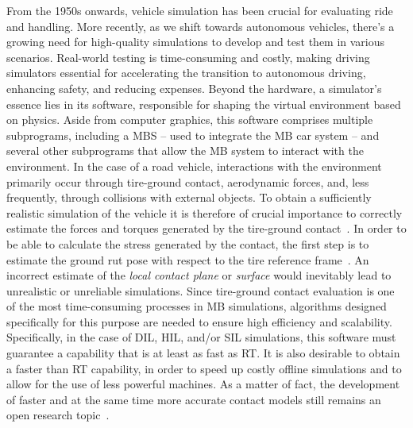 From the 1950s onwards, vehicle simulation has been crucial for evaluating ride and handling. More recently, as we shift towards autonomous vehicles, there's a growing need for high-quality simulations to develop and test them in various scenarios. Real-world testing is time-consuming and costly, making driving simulators essential for accelerating the transition to autonomous driving, enhancing safety, and reducing expenses. Beyond the hardware, a simulator's essence lies in its software, responsible for shaping the virtual environment based on physics. Aside from computer graphics, this software comprises multiple subprograms, including a \ac{MBS} -- used to integrate the \ac{MB} car system -- and several other subprograms that allow the \ac{MB} system to interact with the environment. In the case of a road vehicle, interactions with the environment primarily occur through tire-ground contact, aerodynamic forces, and, less frequently, through collisions with external objects. To obtain a sufficiently realistic simulation of the vehicle it is therefore of crucial importance to correctly estimate the forces and torques generated by the tire-ground contact~\cite{pacejka2012tire}. In order to be able to calculate the stress generated by the contact, the first step is to estimate the ground rut pose with respect to the tire reference frame~\cite{pacejka2005spin}. An incorrect estimate of the \emph{local contact plane} or \emph{surface} would inevitably lead to unrealistic or unreliable simulations. Since tire-ground contact evaluation is one of the most time-consuming processes in \ac{MB} simulations, algorithms designed specifically for this purpose are needed to ensure high efficiency and scalability. Specifically, in the case of \ac{DIL}, \ac{HIL}, and/or \ac{SIL} simulations, this software must guarantee a capability that is at least as fast as \ac{RT}. It is also desirable to obtain a faster than \ac{RT} capability, in order to speed up costly offline simulations and to allow for the use of less powerful machines.  As a matter of fact, the development of faster and at the same time more accurate contact models still remains an open research topic~\cite{gallrein2014advanced, serban2023realtime}.

